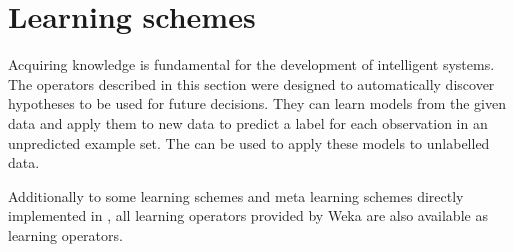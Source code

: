 \section{Learning schemes}

Acquiring knowledge is fundamental for the development of intelligent
systems. The operators described in this section were designed to
automatically discover hypotheses to be used for future
decisions. They can learn models from the given data and apply them to
new data to predict a label for each observation in an unpredicted
example set. The  can be used to apply these models
to unlabelled data.

Additionally to some learning schemes and meta learning schemes directly
implemented in \rapidminer, all learning operators provided by Weka are also
available as \rapidminer learning operators.

